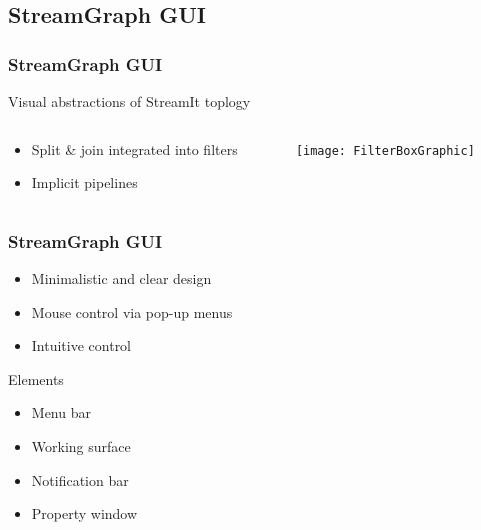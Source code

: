 \documentclass{beamer}
\begin{document}
\subsection{StreamGraph GUI}

\begin{frame}
\frametitle{StreamGraph GUI}
	Visual abstractions of StreamIt toplogy
	\begin{columns}[c]
		\begin{column}{0.48\textwidth}
			\begin{itemize}	
				\item Split \& join integrated into filters
				\item Implicit pipelines
			\end{itemize}
		\end{column}
		\hfill
		\begin{column}{0.48\textwidth}
			\texttt{[image: FilterBoxGraphic]}
			\label{fig_filterAbstraction}		
		\end{column}
	\end{columns}		
\end{frame}

\begin{frame}
\frametitle{StreamGraph GUI}
	\begin{itemize}
		\item Minimalistic and clear design
		\item Mouse control via pop-up menus
		\item Intuitive control
	\end{itemize}
	\begin{block}{Elements}
		\begin{itemize}
			\item Menu bar
			\item Working surface
			\item Notification bar
			\item Property window
		\end{itemize}
	\end{block}
\end{frame}

\end{document}
